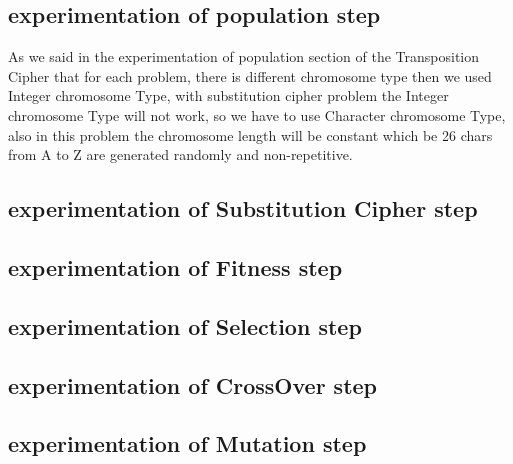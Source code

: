 \subsection{experimentation of population step}
As we said in the experimentation of population section of the Transposition Cipher that for each problem, there is different chromosome type then we used Integer chromosome Type, with substitution cipher problem the Integer chromosome Type will not work, so we have to use Character  chromosome Type, also in this problem the chromosome length will be constant which be 26 chars from A to Z are generated randomly and non-repetitive.


\newpage
\subsection{experimentation of Substitution Cipher step}


\newpage
\subsection{experimentation of Fitness step}


\newpage
\subsection{experimentation of Selection step}


\newpage
\subsection{experimentation of CrossOver step}


\newpage
\subsection{experimentation of Mutation step}


\newpage
